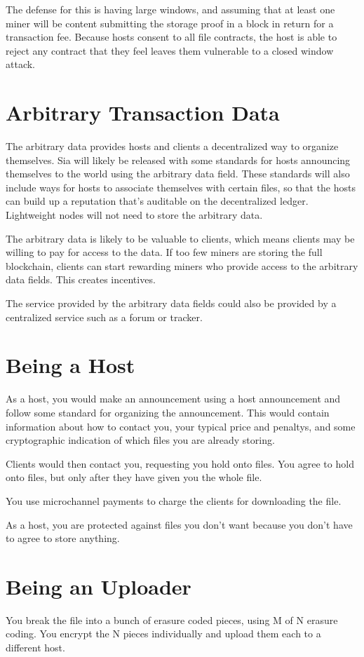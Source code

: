 \documentclass[twocolumn]{article}
\begin{document}
The defense for this is having large windows, and assuming that at least one miner will be content submitting the storage proof in a block in return for a transaction fee.
Because hosts consent to all file contracts, the host is able to reject any contract that they feel leaves them vulnerable to a closed window attack.

\section{Arbitrary Transaction Data}
The arbitrary data provides hosts and clients a decentralized way to organize themselves.
Sia will likely be released with some standards for hosts announcing themselves to the world using the arbitrary data field.
These standards will also include ways for hosts to associate themselves with certain files, so that the hosts can build up a reputation that's auditable on the decentralized ledger.
Lightweight nodes will not need to store the arbitrary data.

The arbitrary data is likely to be valuable to clients, which means clients may be willing to pay for access to the data.
If too few miners are storing the full blockchain, clients can start rewarding miners who provide access to the arbitrary data fields.
This creates incentives.

The service provided by the arbitrary data fields could also be provided by a centralized service such as a forum or tracker.

\section{Being a Host}
As a host, you would make an announcement using a host announcement and follow some standard for organizing the announcement.
This would contain information about how to contact you, your typical price and penaltys, and some cryptographic indication of which files you are already storing.

Clients would then contact you, requesting you hold onto files.
You agree to hold onto files, but only after they have given you the whole file.

You use microchannel payments to charge the clients for downloading the file.

As a host, you are protected against files you don't want because you don't have to agree to store anything.

\section{Being an Uploader}
You break the file into a bunch of erasure coded pieces, using M of N erasure coding.
You encrypt the N pieces individually and upload them each to a different host.
\end{document}
